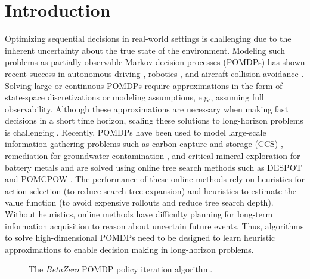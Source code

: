 \section{Introduction}
Optimizing sequential decisions in real-world settings is challenging due to the inherent uncertainty about the true state of the environment.
Modeling such problems as partially observable Markov decision processes (POMDPs) has shown recent success in autonomous driving \citep{wray2021pomdps}, robotics \citep{lauri2022partially}, and aircraft collision avoidance \citep{kochenderfer2012next}.
Solving large or continuous POMDPs require approximations in the form of state-space discretizations or modeling assumptions, e.g., assuming full observability.
Although these approximations are necessary when making fast decisions in a short time horizon, scaling these solutions to long-horizon problems is challenging \cite{shani2013survey}.
Recently, POMDPs have been used to model large-scale information gathering problems such as carbon capture and storage (CCS) \citep{corso2022pomdp,wang2023optimizing}, remediation for groundwater contamination \cite{wang2022sequential}, and critical mineral exploration for battery metals \citep{mern2023intelligent} and are solved using online tree search methods such as DESPOT \cite{ye2017despot} and POMCPOW \citep{sunberg2018online}.
The performance of these online methods rely on heuristics for action selection (to reduce search tree expansion) and heuristics to estimate the value function (to avoid expensive rollouts and reduce tree search depth).
Without heuristics, online methods have difficulty planning for long-term information acquisition to reason about uncertain future events.
Thus, algorithms to solve high-dimensional POMDPs need to be designed to learn heuristic approximations to enable decision making in long-horizon problems.

\begin{figure}[t]
    \centering
    \resizebox{\linewidth}{!}{
        
    }
    \caption{The \textit{BetaZero} POMDP policy iteration algorithm.}
    \label{fig:betazero-alg}
\end{figure}

\begin{figure*}[t!]
    \centering
    \resizebox{0.65\textwidth}{!}{
        
    }
    \caption{The four stages of MCTS in \textit{BetaZero} using a value $V_\theta$ and policy $P_\theta$ network (the \textit{policy evaluation} step in \cref{fig:betazero-alg}).}
    \label{fig:mcts-betazero}
\end{figure*}

